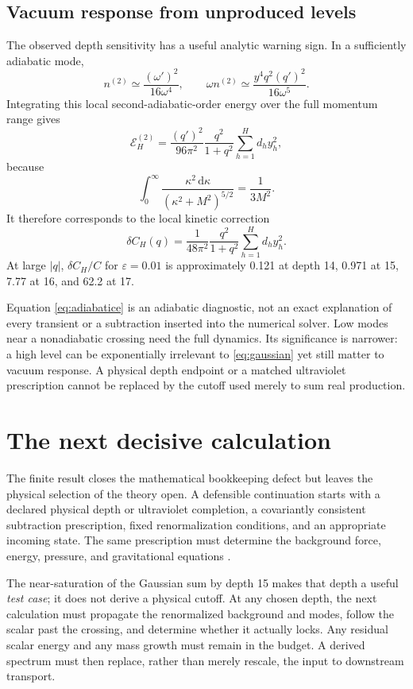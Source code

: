 \documentclass[11pt]{article}
\theoremstyle{definition}\newtheorem{definition}[theorem]{Definition}
\newcommand{\dd}{\mathrm d}\newcommand{\eps}{\varepsilon}
\begin{document}
\subsection{Vacuum response from unproduced levels}
The observed depth sensitivity has a useful analytic warning sign. In a sufficiently adiabatic mode,
\begin{equation}
 n^{(2)}\simeq\frac{(\omega')^2}{16\omega^4},\qquad
 \omega n^{(2)}\simeq\frac{y^4q^2(q')^2}{16\omega^5}.
\end{equation}
Integrating this local second-adiabatic-order energy over the full momentum range gives
\begin{equation}
 \mathcal E^{(2)}_H
 =\frac{(q')^2}{96\pi^2}\frac{q^2}{1+q^2}
 \sum_{h=1}^H d_hy_h^2,
 \label{eq:adiabatice}
\end{equation}
because
\[
 \int_0^\infty\frac{\kappa^2\,\dd\kappa}{(\kappa^2+M^2)^{5/2}}
 =\frac{1}{3M^2}.
\]
It therefore corresponds to the local kinetic correction
\begin{equation}
 \delta C_H(q)=\frac{1}{48\pi^2}\frac{q^2}{1+q^2}
 \sum_{h=1}^H d_hy_h^2.
\end{equation}
At large $|q|$, $\delta C_H/C$ for $\eps=0.01$ is approximately 0.121 at depth 14, 0.971 at 15, 7.77 at 16, and 62.2 at 17.

Equation \eqref{eq:adiabatice} is an adiabatic diagnostic, not an exact explanation of every transient or a subtraction inserted into the numerical solver. Low modes near a nonadiabatic crossing need the full dynamics. Its significance is narrower: a high level can be exponentially irrelevant to \eqref{eq:gaussian} yet still matter to vacuum response. A physical depth endpoint or a matched ultraviolet prescription cannot be replaced by the cutoff used merely to sum real production.

\section{The next decisive calculation}
The finite result closes the mathematical bookkeeping defect but leaves the physical selection of the theory open. A defensible continuation starts with a declared physical depth or ultraviolet completion, a covariantly consistent subtraction prescription, fixed renormalization conditions, and an appropriate incoming state. The same prescription must determine the background force, energy, pressure, and gravitational equations \cite{mpr,psar}.

The near-saturation of the Gaussian sum by depth 15 makes that depth a useful \emph{test case}; it does not derive a physical cutoff. At any chosen depth, the next calculation must propagate the renormalized background and modes, follow the scalar past the crossing, and determine whether it actually locks. Any residual scalar energy and any mass growth must remain in the budget. A derived spectrum must then replace, rather than merely rescale, the input to downstream transport.
\end{document}

